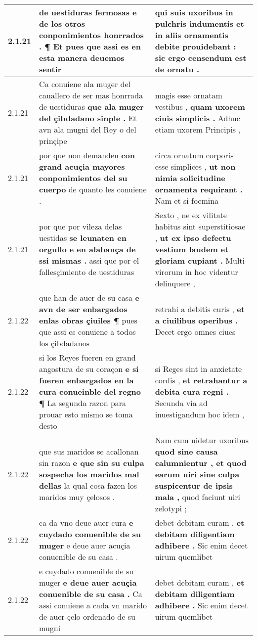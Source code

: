 \begin{tabular}{|p{1cm}|p{6.5cm}|p{6.5cm}|}
2.1.21 & de uestiduras fermosas \textbf{ e de los otros conponimientos honrrados . } ¶ Et pues que assi es en esta manera deuemos sentir & qui suis uxoribus in pulchris indumentis \textbf{ et in aliis ornamentis debite prouidebant : } sic ergo censendum est de ornatu . \\\hline
2.1.21 & Ca conuiene ala muger del cauallero de ser mas honrrada de uestiduras \textbf{ que ala muger del çibdadano sinple . } Et avn ala mugni del Rey o del prinçipe & magis esse ornatam vestibus , \textbf{ quam uxorem ciuis simplicis . } Adhuc etiam uxorem Principis , \\\hline
2.1.21 & por que non demanden \textbf{ con grand acuçia mayores conponimientos del su cuerpo } de quanto les conuiene . & circa ornatum corporis esse simplices , \textbf{ ut non nimia solicitudine ornamenta requirant . } Nam et si foemina \\\hline
2.1.21 & por que por vileza delas uestidas \textbf{ se leunaten en orgullo e en alabança de ssi mismas . } assi que por el fallesçimiento de uestiduras & Sexto , ne ex vilitate habitus sint superstitiosae , \textbf{ ut ex ipso defectu vestium laudem et gloriam cupiant . } Multi virorum in hoc videntur delinquere , \\\hline
2.1.22 & que han de auer de su casa \textbf{ e avn de ser enbargados enlas obras çiuiles ¶ } pues que assi es conuiene a todos los çibdadanos & retrahi a debitis curis , \textbf{ et a ciuilibus operibus . } Decet ergo omnes ciues \\\hline
2.1.22 & si los Reyes fueren en grand angostura de su coraçon \textbf{ e si fueren enbargados en la cura conueinble del regno ¶ } La segunda razon para prouar esto mismo se toma desto & si Reges sint in anxietate cordis , \textbf{ et retrahantur a debita cura regni . } Secunda via ad inuestigandum hoc idem , \\\hline
2.1.22 & que sus maridos se acallonan sin razon \textbf{ e que sin su culpa sospecha los maridos mal dellas } la qual cosa fazen los maridos muy çelosos . & Nam cum uidetur uxoribus \textbf{ quod sine causa calumnientur , et quod earum uiri sine culpa suspicentur de ipsis mala , } quod faciunt uiri zelotypi ; \\\hline
2.1.22 & ca da vno deue auer cura \textbf{ e cuydado conuenible de su muger } e deue auer acuçia conuenible de su casa . & debet debitam curam , \textbf{ et debitam diligentiam adhibere . } Sic enim decet uirum quemlibet \\\hline
2.1.22 & e cuydado conuenible de su muger \textbf{ e deue auer acuçia conuenible de su casa . } Ca assi conuiene a cada vn marido de auer çelo ordenado de su mugni & debet debitam curam , \textbf{ et debitam diligentiam adhibere . } Sic enim decet uirum quemlibet \\\hline

\end{tabular}
